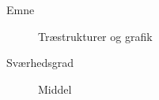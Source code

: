 \begin{description}
\item[Emne] Træstrukturer og grafik
\item[Sværhedsgrad] Middel
\end{description}
